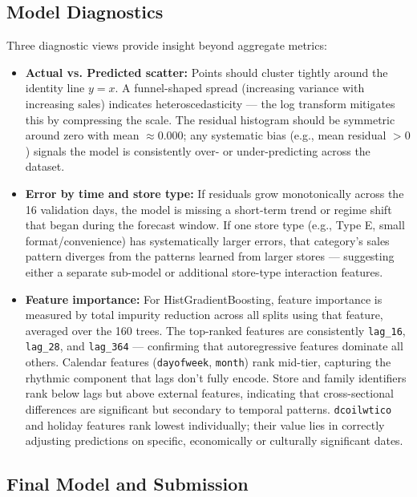 \subsection{Model Diagnostics}

Three diagnostic views provide insight beyond aggregate metrics:

\begin{itemize}
  \item \textbf{Actual vs. Predicted scatter:} Points should cluster tightly around the identity line $y = x$. A funnel-shaped spread (increasing variance with increasing sales) indicates heteroscedasticity — the log transform mitigates this by compressing the scale. The residual histogram should be symmetric around zero with mean $\approx 0.000$; any systematic bias (e.g., mean residual $> 0$) signals the model is consistently over- or under-predicting across the dataset.
  \item \textbf{Error by time and store type:} If residuals grow monotonically across the 16 validation days, the model is missing a short-term trend or regime shift that began during the forecast window. If one store type (e.g., Type E, small format/convenience) has systematically larger errors, that category's sales pattern diverges from the patterns learned from larger stores — suggesting either a separate sub-model or additional store-type interaction features.
  \item \textbf{Feature importance:} For HistGradientBoosting, feature importance is measured by total impurity reduction across all splits using that feature, averaged over the 160 trees. The top-ranked features are consistently \texttt{lag\_16}, \texttt{lag\_28}, and \texttt{lag\_364} — confirming that autoregressive features dominate all others. Calendar features (\texttt{dayofweek}, \texttt{month}) rank mid-tier, capturing the rhythmic component that lags don't fully encode. Store and family identifiers rank below lags but above external features, indicating that cross-sectional differences are significant but secondary to temporal patterns. \texttt{dcoilwtico} and holiday features rank lowest individually; their value lies in correctly adjusting predictions on specific, economically or culturally significant dates.
\end{itemize}

\subsection{Final Model and Submission}

